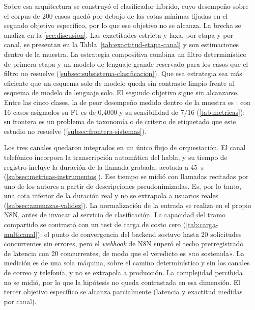 Sobre esa arquitectura se construyó el clasificador híbrido, cuyo desempeño sobre el corpus de 200 casos quedó por debajo de las cotas mínimas fijadas en el segundo objetivo específico, por lo que ese objetivo no se alcanza. La brecha se analiza en la \autoref{sec:discusion}. Las exactitudes estricta y laxa, por etapa y por canal, se presentan en la Tabla~\ref{tab:exactitud-etapa-canal} y son estimaciones dentro de la muestra. La estrategia compositiva combina un filtro determinístico de primera etapa y un modelo de lenguaje grande reservado para los casos que el filtro no resuelve (\autoref{subsec:subsistema-clasificacion}). Que esa estrategia sea más eficiente que un esquema solo de modelo queda sin contraste limpio frente al esquema de modelo de lenguaje solo. El segundo objetivo sigue sin alcanzarse. Entre las cinco clases, la de peor desempeño medido dentro de la muestra es : con 16 casos asignados su F1 es de 0,4000 y su sensibilidad de 7/16 (\autoref{tab:metricas}); su frontera es un problema de taxonomía o de criterio de etiquetado que este estudio no resuelve (\autoref{subsec:frontera-sistemas}).

Los tres canales quedaron integrados en un único flujo de orquestación. El canal telefónico incorpora la transcripción automática del habla, y su tiempo de registro incluye la duración de la llamada grabada, acotada a 45~s (\autoref{subsec:metricas-instrumentos}). Ese tiempo se midió con llamadas recitadas por uno de los autores a partir de descripciones pseudonimizadas. Es, por lo tanto, una cota inferior de la duración real y no se extrapola a usuarios reales (\autoref{subsec:amenazas-validez}). La normalización de la entrada se realiza en el propio N8N, antes de invocar al servicio de clasificación. La capacidad del tramo compartido se contrastó con un test de carga de costo cero (\autoref{tab:carga-multicanal}): el punto de convergencia del backend sostuvo hasta 20 solicitudes concurrentes sin errores, pero el \emph{webhook} de N8N superó el techo prerregistrado de latencia con 20 concurrentes, de modo que el veredicto es «no sostenida». La medición es de una sola máquina, sobre el camino determinístico y sin los canales de correo y telefonía, y no se extrapola a producción. La complejidad percibida no se midió, por lo que la hipótesis no queda contrastada en esa dimensión. El tercer objetivo específico se alcanza parcialmente (latencia y exactitud medidas por canal).

